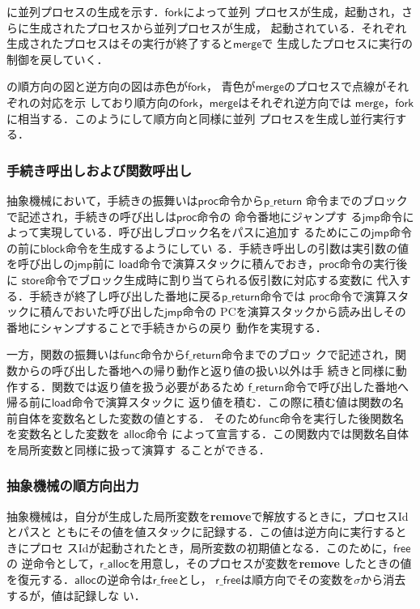 \documentclass[submit,PRO]{ipsj}
\newcommand{\bcode}[1]{$\mathsf{#1}$}
\begin{document}
に並列プロセスの生成を示す．\bcode{fork}によって並列
プロセスが生成，起動され，さらに生成されたプロセスから並列プロセスが生成，
起動されている．それぞれ生成されたプロセスはその実行が終了すると\bcode{merge}で
生成したプロセスに実行の制御を戻していく．

の順方向の図と逆方向の図は赤色が\bcode{fork}，
青色が\bcode{merge}のプロセスで点線がそれぞれの対応を示
しており順方向の\bcode{fork}，\bcode{merge}はそれぞれ逆方向では
\bcode{merge}，\bcode{fork}に相当する．このようにして順方向と同様に並列
プロセスを生成し並行実行する．

\subsubsection{手続き呼出しおよび関数呼出し}

抽象機械において，手続きの振舞いは\bcode{proc}命令から\bcode{p\_return}
命令までのブロックで記述され，手続きの呼び出しは\bcode{proc}命令の
命令番地にジャンプす
る\bcode{jmp}命令によって実現している．呼び出しブロック名をパスに追加す
るためにこの\bcode{jmp}命令の前に\bcode{block}命令を生成するようにしてい
る．手続き呼出しの引数は実引数の値を呼び出しの\bcode{jmp}前に
\bcode{load}命令で演算スタックに積んでおき，\bcode{proc}命令の実行後に
\bcode{store}命令でブロック生成時に割り当てられる仮引数に対応する変数に
代入する．手続きが終了し呼び出した番地に戻る\bcode{p\_return}命令では
\bcode{proc}命令で演算スタックに積んでおいた呼び出した\bcode{jmp}命令の
PCを演算スタックから読み出しその番地にシャンプすることで手続きからの戻り
動作を実現する．

一方，関数の振舞いは\bcode{func}命令から\bcode{f\_return}命令までのブロッ
クで記述され，関数からの呼び出した番地への帰り動作と返り値の扱い以外は手
続きと同様に動作する．関数では返り値を扱う必要があるため
\bcode{f\_return}命令で呼び出した番地へ帰る前に\bcode{load}命令で演算スタックに
返り値を積む．この際に積む値は関数の名前自体を変数名とした変数の値とする．
そのため\bcode{func}命令を実行した後関数名を変数名とした変数を
\bcode{alloc}命令
によって宣言する．この関数内では関数名自体を局所変数と同様に扱って演算す
ることができる．

\subsubsection{抽象機械の順方向出力}

抽象機械は，自分が生成した局所変数を{\bf remove}で解放するときに，プロセスIdとパスと
ともにその値を値スタックに記録する．この値は逆方向に実行するときにプロセ
スIdが起動されたとき，局所変数の初期値となる．このために，\bcode{free}の
逆命令として，\bcode{r\_alloc}を用意し，そのプロセスが変数を{\bf remove}
したときの値を復元する．\bcode{alloc}の逆命令は\bcode{r\_free}とし，
\bcode{r\_free}は順方向でその変数を$\sigma$から消去するが，値は記録しな
い．
\end{document}
